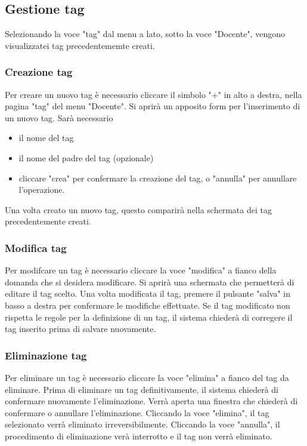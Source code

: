 \documentclass[12pt,a4paper]{article}
\begin{document}
	\subsection{Gestione tag}
	Selezionando la voce "tag" dal menu a lato, sotto la voce "Docente", vengono visualizzatei tag precedentememte creati.
		\subsubsection{Creazione tag}
		Per creare un nuovo tag è necessario cliccare il simbolo "+" in alto a destra, nella pagina "tag" del menu "Docente".
		Si aprirà un apposito form per l'inserimento di un nuovo tag.
		Sarà necessario 
			\begin{itemize}
			\item il nome del tag
			\item il nome del padre del tag (opzionale)
			\item cliccare "crea" per confermare la creazione del tag, o "annulla" per annullare l'operazione.
		\end{itemize}
		
		Una volta creato un nuovo tag, questo comparirà nella schermata dei tag precedentemente creati.
		
		\subsubsection{Modifica tag}
		Per modifcare un tag è necessario cliccare la voce "modifica" a fianco della domanda che si desidera modificare. Si aprirà una schermata che permetterà di editare il tag scelto.
		Una volta modificata il tag, premere il pulsante "salva" in basso a destra per confermare le modifiche effettuate. 
		Se il tag modificato non rispetta le regole per la definizione di un tag, il sistema chiederà di corregere il tag inserito prima di salvare nuovamente.
		\subsubsection{Eliminazione tag}
			Per eliminare un tag è necessario cliccare la voce "elimina" a fianco del tag da eliminare. Prima di eliminare un tag definitivamente, il sistema chiederà di confermare nuovamente l'eliminazione.
			Verrà aperta una finestra che chiederà di confermare o annullare l'eliminazione. Cliccando la voce "elimina", il tag selezionato verrà eliminato irreversibilmente. Cliccando la voce "annulla", il procedimento di eliminazione verà interrotto e il tag non verrà eliminato.
\end{document}
